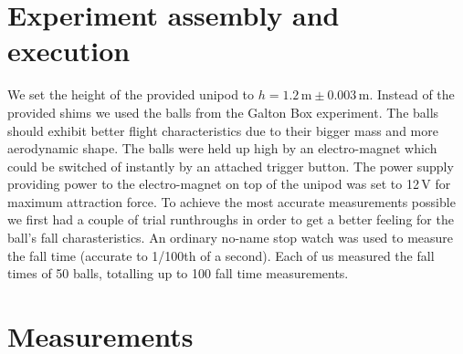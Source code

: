 \documentclass{scrreprt}
\newcommand{\unit}[1]{\ensuremath{\, \mathrm{#1}}}
\begin{document}
\section{Experiment assembly and execution}
We set the height of the provided unipod to $h=1.2\unit{m}\pm 0.003\unit{m}$. Instead of the provided shims we used the balls from the Galton Box experiment. The balls should exhibit better flight characteristics due to their bigger mass and more aerodynamic shape. The balls were held up high by an electro-magnet which could be switched of instantly by an attached trigger button. The power supply providing power to the electro-magnet on top of the unipod was set to 12$\unit{V}$ for maximum attraction force. To achieve the most accurate measurements possible we first had a couple of trial runthroughs in order to get a better feeling for the ball's fall charasteristics. An ordinary no-name stop watch was used to measure the fall time (accurate to 1/100th of a second). Each of us measured the fall times of 50 balls, totalling up to 100 fall time measurements.  

\section{Measurements}
\end{document}
